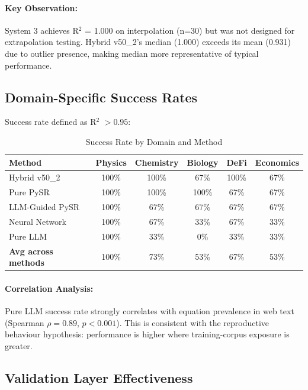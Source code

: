 \documentclass[twoside,11pt]{article}
\begin{document}
\paragraph{Key Observation:} System 3 achieves R$^{2}$ = 1.000 on interpolation (n=30) but was not designed for extrapolation testing. Hybrid v50\_2's median (1.000) exceeds its mean (0.931) due to outlier presence, making median more representative of typical performance.

\subsection{Domain-Specific Success Rates}

Success rate defined as R$^{2}$ $> 0.95$:

\begin{table}[H]
\centering
\caption{Success Rate by Domain and Method}
\label{tab:domain_success_detailed}
\begin{tabular}{lccccc}
\toprule
\textbf{Method} & \textbf{Physics} & \textbf{Chemistry} & \textbf{Biology} & \textbf{DeFi} & \textbf{Economics} \\
\midrule
Hybrid v50\_2 & 100\% & 100\% & 67\% & 100\% & 67\% \\
Pure PySR & 100\% & 100\% & 100\% & 67\% & 67\% \\
LLM-Guided PySR & 100\% & 67\% & 67\% & 67\% & 67\% \\
Neural Network & 100\% & 67\% & 33\% & 67\% & 33\% \\
Pure LLM & 100\% & 33\% & 0\% & 33\% & 33\% \\
\midrule
\textbf{Avg across methods} & 100\% & 73\% & 53\% & 67\% & 53\% \\
\bottomrule
\end{tabular}
\end{table}

\paragraph{Correlation Analysis:} Pure LLM success rate strongly correlates with equation prevalence in web text (Spearman $\rho = 0.89$, $p < 0.001$)\citep{kambhampati2024llms}. This is consistent with the reproductive behaviour hypothesis: performance is higher where training-corpus exposure is greater.

\clearpage
\subsection{Validation Layer Effectiveness}
\end{document}
